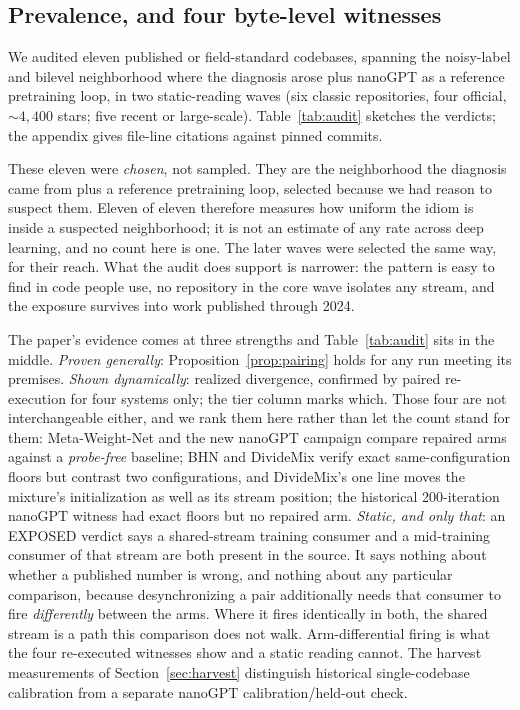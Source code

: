 \subsection{Prevalence, and four byte-level witnesses}
\label{sec:prevalence}

We audited eleven published or field-standard codebases, spanning the
noisy-label and bilevel neighborhood where the diagnosis arose plus
nanoGPT as a reference pretraining loop, in two static-reading waves
(six classic repositories, four official, ${\sim}4{,}400$ stars; five
recent or large-scale). Table~\ref{tab:audit} sketches the verdicts; the
appendix gives file-line citations against pinned commits.

These eleven were \emph{chosen}, not sampled. They are the neighborhood the
diagnosis came from plus a reference pretraining loop, selected because we had
reason to suspect them. Eleven of eleven therefore measures how uniform the
idiom is inside a suspected neighborhood; it is not an estimate of any rate
across deep learning, and no count here is one. The later waves were selected the
same way, for their reach. What the audit does support is narrower: the pattern is
easy to find in code people use, no repository in the core wave isolates any
stream, and the exposure survives into work published through 2024.

The paper's evidence comes at three strengths and Table~\ref{tab:audit} sits in
the middle. \emph{Proven generally}: Proposition~\ref{prop:pairing} holds for
any run meeting its premises. \emph{Shown dynamically}: realized divergence,
confirmed by paired re-execution for four systems only; the tier column marks
which. Those four are not interchangeable either, and we rank them here rather
than let the count stand for them: Meta-Weight-Net and the new nanoGPT
campaign compare repaired arms against a \emph{probe-free} baseline; BHN and DivideMix
verify exact same-configuration floors but contrast two configurations, and
DivideMix's one line moves the mixture's initialization as well as its stream
position; the historical 200-iteration nanoGPT witness had exact floors but
no repaired arm. \emph{Static, and only that}: an EXPOSED verdict says a shared-stream
training consumer and a mid-training consumer of that stream are both present
in the source. It says nothing about whether a published number is wrong, and
nothing about any particular comparison, because desynchronizing a pair
additionally needs that consumer to fire \emph{differently} between the arms.
Where it fires identically in both, the shared stream is a path this comparison
does not walk. Arm-differential firing is what the four re-executed witnesses
show and a static reading cannot. The harvest measurements of
Section~\ref{sec:harvest} distinguish historical single-codebase calibration
from a separate nanoGPT calibration/held-out check.

